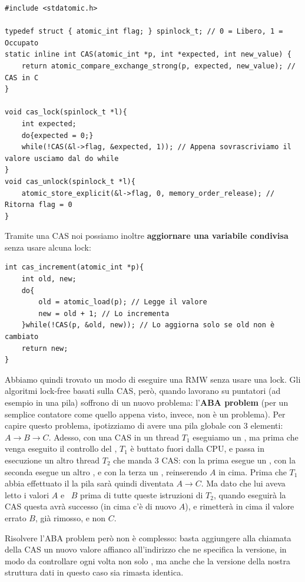 \documentclass[11pt, a4paper, titlepage, oneside]{scrbook}
\begin{document}
\begin{lstlisting}[style=C]
#include <stdatomic.h>

typedef struct { atomic_int flag; } spinlock_t; // 0 = Libero, 1 = Occupato
static inline int CAS(atomic_int *p, int *expected, int new_value) { 
    return atomic_compare_exchange_strong(p, expected, new_value); // CAS in C
}

void cas_lock(spinlock_t *l){
    int expected;
    do{expected = 0;}
    while(!CAS(&l->flag, &expected, 1)); // Appena sovrascriviamo il valore usciamo dal do while
}
void cas_unlock(spinlock_t *l){
    atomic_store_explicit(&l->flag, 0, memory_order_release); // Ritorna flag = 0
}
\end{lstlisting}

Tramite una CAS noi possiamo inoltre \textbf{aggiornare una variabile condivisa} senza usare alcuna lock:
\begin{lstlisting}[style=C]
int cas_increment(atomic_int *p){
    int old, new;
    do{
        old = atomic_load(p); // Legge il valore
        new = old + 1; // Lo incrementa
    }while(!CAS(p, &old, new)); // Lo aggiorna solo se old non è cambiato
    return new;
}
\end{lstlisting}

Abbiamo quindi trovato un modo di eseguire una RMW senza usare una lock. Gli algoritmi lock-free basati sulla CAS, però, quando lavorano su puntatori (ad esempio in una pila) soffrono di un nuovo problema: l'\textbf{ABA problem} (per un semplice contatore come quello appena visto, invece, non è un problema). Per capire questo problema, ipotizziamo di avere una pila globale con 3 elementi: $A \longrightarrow B \longrightarrow C$. Adesso, con una CAS in un thread $T_1$ eseguiamo un , ma prima che venga eseguito il controllo del , $T_1$ è buttato fuori dalla CPU, e passa in esecuzione un altro thread $T_2$ che manda 3 CAS: con la prima esegue un , con la seconda esegue un altro , e con la terza un , reinserendo $A$ in cima. Prima che $T_1$ abbia effettuato il  la pila sarà quindi diventata $A \longrightarrow C$. Ma dato che lui aveva letto i valori \mbox{} $A$ e \mbox{ $B$} prima di tutte queste istruzioni di $T_2$, quando eseguirà la CAS questa avrà successo (in cima c'è di nuovo $A$), e rimetterà in cima il valore errato $B$, già rimosso, e non $C$. 

Risolvere l'ABA problem però non è complesso: basta aggiungere alla chiamata della CAS un nuovo valore affianco all'indirizzo che ne specifica la versione, in modo da controllare ogni volta non solo , ma anche che la versione della nostra struttura dati in questo caso sia rimasta identica.
\end{document}
